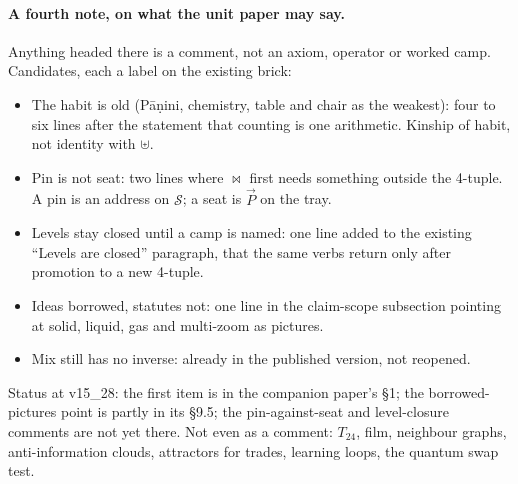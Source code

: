 \documentclass[12pt, a4paper]{article}
\begin{document}
\paragraph{A fourth note, on what the unit paper may say.} Anything
headed there is a comment, not an axiom, operator or worked camp.
Candidates, each a label on the existing brick:
\begin{itemize}
\item The habit is old (P\={a}\d{n}ini, chemistry, table and chair
      as the weakest): four to six lines after the statement that
      counting is one arithmetic. Kinship of habit, not identity with $\uplus$.
\item Pin is not seat: two lines where $\bowtie$ first needs
      something outside the 4-tuple. A pin is an address on
      $\mathcal{S}$; a seat is $\vec P$ on the tray.
\item Levels stay closed until a camp is named: one line added to
      the existing ``Levels are closed'' paragraph, that the same
      verbs return only after promotion to a new 4-tuple.
\item Ideas borrowed, statutes not: one line in the claim-scope
      subsection pointing at solid, liquid, gas and multi-zoom as
      pictures.
\item Mix still has no inverse: already in the published version,
      not reopened.
\end{itemize}
Status at v15\_28: the first item is in the companion paper's \S1; the borrowed-pictures point is partly in its
\S9.5; the pin-against-seat and level-closure comments are not yet there.
Not even as a comment: $T_{24}$, film, neighbour graphs,
anti-information clouds, attractors for trades, learning loops, the
quantum swap test.
\end{document}
